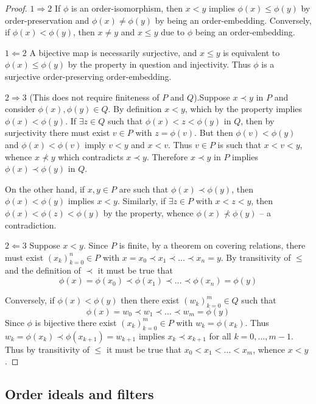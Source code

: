 \documentclass[a4paper]{article}
\newcommand{\brac}[1]{{\left ( #1 \right )}}
\begin{document}
\begin{proof}
$1 \Rightarrow 2$ If $\phi$ is an order-isomorphism, then $x<y$ implies $\phi(x)\leq \phi(y)$ by order-preservation and $\phi(x)\neq \phi(y)$ by being an order-embedding. Conversely, if $\phi(x) < \phi(y)$, then $x\neq y$ and $x\leq y$ due to $\phi$ being an order-embedding.

$1 \Leftarrow 2$ A bijective map is necessarily surjective, and $x\leq y$ is equivalent to $\phi(x)\leq \phi(y)$ by the property in question and injectivity. Thus $\phi$ is a surjective order-preserving order-embedding.

$2 \Rightarrow 3$ (This does not require finiteness of $P$ and $Q$).Suppose $x\prec y$ in $P$ and consider $\phi(x),\phi(y)\in Q$. By definition $x<y$, which by the property implies $\phi(x)<\phi(y)$. If $\exists z\in Q$ such that $\phi(x)<z<\phi(y)$ in $Q$, then by surjectivity there must exist $v\in P$ with $z=\phi(v)$. But then $\phi(v)<\phi(y)$ and $\phi(x)<\phi(v)$ imply $v<y$ and $x<v$. Thus $v\in P$ is such that $x<v<y$, whence $x\not\prec y$ which contradicts $x\prec y$. Therefore $x\prec y$ in $P$ implies $\phi(x)\prec \phi(y)$ in $Q$.

On the other hand, if $x,y\in P$ are such that $\phi(x)\prec \phi(y)$, then $\phi(x)< \phi(y)$ implies $x<y$. Similarly, if $\exists z\in P$ with $x<z<y$, then $\phi(x)<\phi(z)<\phi(y)$ by the property, whence $\phi(x)\not\prec \phi(y)$ -- a contradiction.

$2 \Leftarrow 3$ Suppose $x<y$. Since $P$ is finite, by a theorem on covering relations, there must exist $\brac{x_k}_{k=0}^n\in P$ with $x=x_0 \prec x_1 \prec \ldots \prec x_n=y$. By transitivity of $\leq$ and the definition of $\prec$ it must be true that \[\phi(x) = \phi(x_0) \prec \phi(x_1) \prec \ldots \prec \phi(x_n) = \phi(y)\]

Conversely, if $\phi(x) < \phi(y)$ then there exist $\brac{w_k}_{k=0}^m\in Q$ such that \[\phi(x) = w_0 \prec w_1 \prec \ldots \prec w_m = \phi(y)\] Since $\phi$ is bijective there exist $\brac{x_k}_{k=0}^m\in P$ with $w_k=\phi(x_k)$. Thus $w_k = \phi(x_k)\prec \phi(x_{k+1})=w_{k+1}$ implies $x_k\prec x_{k+1}$ for all $k=0,\ldots,{m-1}$. Thus by transitivity of $\leq$ it must be true that $x_0<x_1<\ldots<x_m$, whence $x<y$.
\end{proof}


\subsection{Order ideals and filters} %
\label{sub:order_ideals_and_filters}
\end{document}
